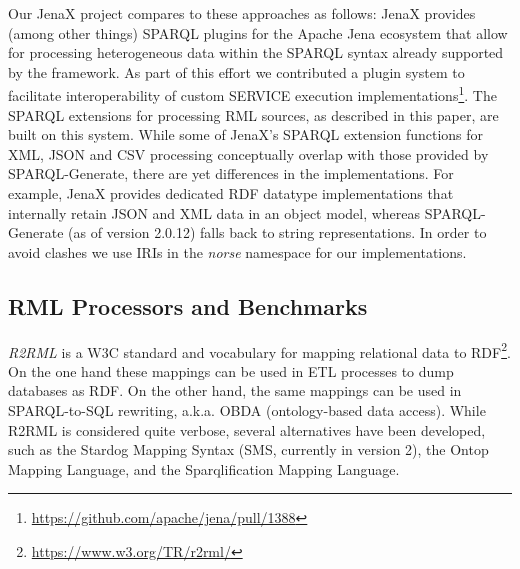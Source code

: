 Our JenaX project compares to these approaches as follows: JenaX provides (among other things) SPARQL plugins for the Apache Jena ecosystem that allow for processing heterogeneous data within the SPARQL syntax already supported by the framework.
As part of this effort we contributed a plugin system to facilitate interoperability of custom SERVICE execution implementations\footnote{\url{https://github.com/apache/jena/pull/1388}}. 
The SPARQL extensions for processing RML sources, as described in this paper, are built on this system.
While some of JenaX's SPARQL extension functions for XML, JSON and CSV processing conceptually overlap with those provided by SPARQL-Generate, there are yet differences in the implementations. For example, JenaX provides dedicated RDF datatype implementations that internally retain JSON and XML data in an object model, whereas SPARQL-Generate (as of version 2.0.12) falls back to string representations.
In order to avoid clashes we use IRIs in the \emph{norse} namespace for our implementations.



\subsection{RML Processors and Benchmarks}
\emph{R2RML} is a W3C standard and vocabulary for mapping relational data to RDF\footnote{\url{https://www.w3.org/TR/r2rml/}}.
On the one hand these mappings can be used in ETL processes to dump databases as RDF. On the other hand, the same mappings can be used in SPARQL-to-SQL rewriting, a.k.a. OBDA (ontology-based data access). While R2RML is considered quite verbose, several alternatives have been developed, such as the Stardog Mapping Syntax (SMS, currently in version 2), the Ontop Mapping Language\cite{calvanese2017ontop}, and the Sparqlification Mapping Language\cite{stadler2015simplified}.

